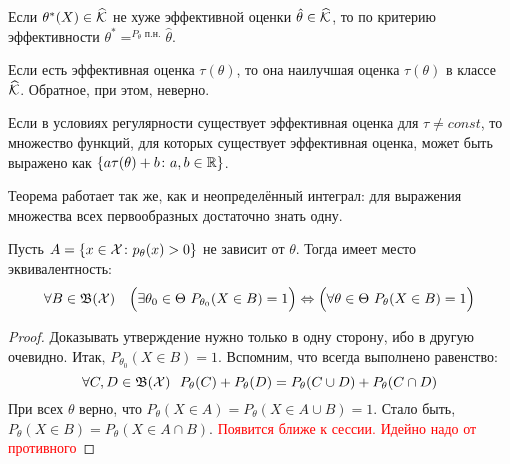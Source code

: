\begin{corollary}
	Если $\theta^*(X) \in \widehat{\mathcal{K}}$ не хуже эффективной оценки $\hat{\theta} \in \widehat{\mathcal{K}}$, то по критерию эффективности $\theta^* =^{P_\theta\text{ п.н.}} \hat{\theta}$.
\end{corollary}

\begin{note}
	Если есть эффективная оценка $\tau(\theta)$, то она наилучшая оценка $\tau(\theta)$ в классе $\widehat{\mathcal{K}}$. Обратное, при этом, неверно.
\end{note}

\begin{theorem}
	Если в условиях регулярности существует эффективная оценка для $\tau \neq const$, то множество функций, для которых существует эффективная оценка, может быть выражено как $\{a\tau(\theta) + b \colon a, b \in \mathbb{R}\}$.
\end{theorem}

\begin{anote}
	Теорема работает так же, как и неопределённый интеграл: для выражения множества всех первообразных достаточно знать одну.
\end{anote}

\begin{proposition}
	Пусть $A = \{x \in \mathcal{X} \colon p_\theta(x) > 0\}$ не зависит от $\theta$. Тогда имеет место эквивалентность:
	\[
		\forall B \in \mathfrak{B}(\mathcal{X})\quad \Big(\exists \theta_0 \in \Theta\ P_{\theta_0}(X \in B) = 1\Big) \Leftrightarrow \Big(\forall \theta \in \Theta\ P_\theta(X \in B) = 1\Big)
	\]
\end{proposition}

\begin{proof}
	Доказывать утверждение нужно только в одну сторону, ибо в другую очевидно. Итак, $P_{\theta_0}(X \in B) = 1$. Вспомним, что всегда выполнено равенство:
	\[
		\forall C, D \in \mathfrak{B}(\mathcal{X})\ \ P_\theta(C) + P_\theta(D) = P_\theta(C \cup D) + P_\theta(C \cap D)
	\]
	При всех $\theta$ верно, что $P_\theta(X \in A) = P_\theta(X \in A \cup B) = 1$. Стало быть, $P_\theta(X \in B) = P_\theta(X \in A \cap B)$.
	\textcolor{red}{Появится ближе к сессии. Идейно надо от противного}
\end{proof}

